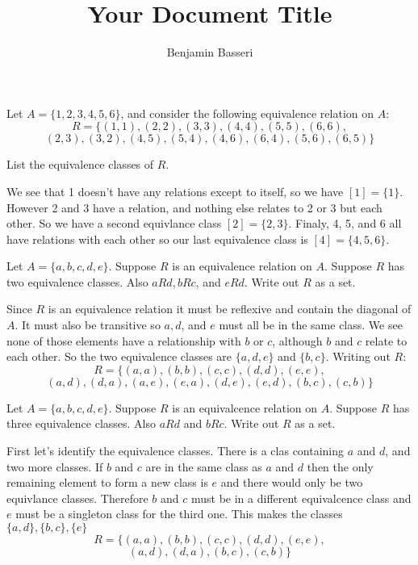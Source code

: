 \documentclass{article}
\title{Your Document Title}
\author{Benjamin Basseri}
\date{}
\begin{document}
\maketitle

\begin{problem}
Let $A = \{1, 2, 3, 4, 5, 6\}$, and consider the following equivalence relation on $A$:
$$R = \{(1, 1), (2, 2), (3, 3), (4, 4), (5, 5), (6, 6),$$
$$(2, 3), (3, 2), (4, 5), (5, 4), (4, 6), (6, 4), (5, 6), (6, 5)\}$$

List the equivalence classes of $R$.
\end{problem}

We see that 1 doesn't have any relations except to itself, so we have $[1] = \{1\}$. However 2 and 3 have a relation, and nothing else relates to 2 or 3 but each other. So we have a second equivlance class $[2] = \{2, 3\}$. Finaly, 4, 5, and 6 all have relations with each other so our last equivalence class is $[4] = \{4, 5, 6\}$.

\begin{problem}
Let $A = \{a, b, c, d, e\}$. Suppose $R$ is an equivalence relation on $A$. Suppose $R$ has two equivalence classes. Also $aRd, bRc$, and $eRd$. Write out $R$ as a set.
\end{problem}

Since $R$ is an equivalence relation it must be reflexive and contain the diagonal of $A$. It must also be transitive so $a, d$, and $e$ must all be in the same class. We see none of those elements have a relationship with $b$ or $c$, although $b$ and $c$ relate to each other. So the two equivalence classes are $\{a, d, e\}$ and $\{b, c\}$. Writing out $R$:
$$R = \{(a, a), (b, b), (c, c), (d, d), (e, e), $$
$$(a, d), (d, a), (a, e), (e, a), (d, e), (e, d), (b, c), (c, b)\}$$

\begin{problem}
Let $A = \{a, b, c, d, e\}$. Suppose $R$ is an equivalcence relation on $A$. Suppose $R$ has three equivalence classes. Also $aRd$ and $bRc$. Write out $R$ as a set.
\end{problem}

First let's identify the equivalence classes. There is a clas containing $a$ and $d$, and two more classes. If $b$ and $c$ are in the same class as $a$ and $d$ then the only remaining element to form a new class is $e$ and there would only be two equivlance classes. Therefore $b$ and $c$ must be in a different equivalcence class and $e$ must be a singleton class for the third one. This makes the classes $\{a, d\}, \{b, c\}, \{e\}$
$$R = \{(a, a), (b, b), (c, c), (d, d), (e, e), $$
$$(a, d), (d, a), (b, c), (c, b)\}$$
\end{document}
